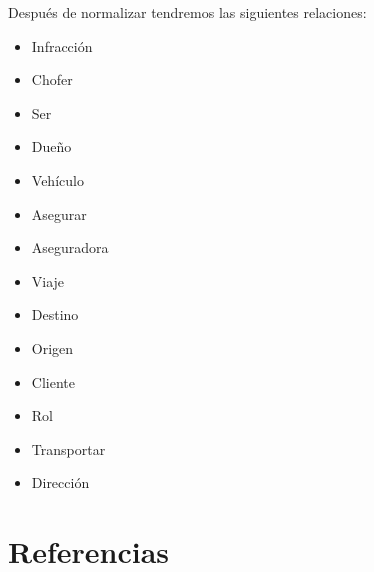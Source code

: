 \documentclass{article}
\begin{document}
Después de normalizar tendremos las siguientes relaciones:
\begin{itemize}
\item Infracción\\
\item Chofer\\
\item Ser\\
\item Dueño\\
\item Vehículo\\
\item Asegurar\\
\item Aseguradora\\
\item Viaje\\
\item Destino\\
\item Origen\\
\item Cliente\\
\item Rol\\
\item Transportar\\
\item Dirección\\

\end{itemize}




\section{Referencias}
\end{document}
